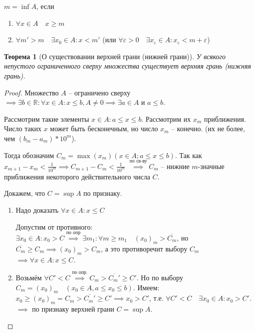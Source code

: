 \documentclass[a4paper,oneside]{article}
\newcommand{\bydef}{\stackrel{\text{по опр.}}{\implies}} %
\newtheorem{theorem}{Теорема}[subsection]
\theoremstyle{definition}
\theoremstyle{definition}
\theoremstyle{definition}
\begin{document}
$m = \inf A$, если 
\begin{enumerate}
    \item $\forall x \in A \quad x \ge m$
    \item $\forall m' > m \quad \exists x_0 \in A: x < m'$
    (или $\forall \varepsilon > 0 \quad \exists x_\varepsilon \in A: x_\varepsilon < m + \varepsilon$)
\end{enumerate}

\begin{theorem}[О существовании верхней грани (нижней грани)]
    У всякого непустого ограниченного сверху множества существует верхняя грань (нижняя грань).
\end{theorem}

\begin{proof}
    Множество $A$ -- ограничено сверху $\implies \exists b \in \mathbb{R}: \forall x \in A:
    x \le b, A \ne 0 \implies \exists a \in A$ и $a \le b$.

    Рассмотрим такие элементы $x \in A: a \le x \le b$. Рассмотрим их $x_m$ приближения.
    Число таких $x$ может быть бесконечным, но число $x_m$ -- конечно.
    (их не более, чем $(b_m - a_m) * 10^m$). 

    Тогда обозначим $C_m = \max (x_m) (x \in A; a \le x \le b)$.
    Так как $x_{m+1} - x_m < \frac{1}{10^m} \implies C_{m+1} - C_m < \frac{1}{10^m}$
    $\stackrel{\text{по св-ву}}{\implies} C_m$ -- нижние $m$-значные приближения некоторого 
    действительного числа $C$.

    Докажем, что $C = \sup A$ по признаку.
    \begin{enumerate}
        \item Надо доказать $\forall x \in A: x \le C$
        
        Допустим от противного: $\exists x_0 \in A: x_0 > C \stackrel{\text{по опр}}{\implies}
        \exists m_1: \forall m \ge m_1 \quad (x_0)_m > \overline{C_m}$, но
        $\overline{C_m} \ge C_m \implies (x_0)_m > C_m$, а это противоречит выбору $C_m$
        $\implies \forall x \in A: x \le C$.

        \item Возьмём $\forall C' < C \bydef C_m > \overline{C_m'} \ge C'$.
        Но по выбору $C_m = (x_0)_m \quad (x_0 \in A, a \le x_0 \le b)$.
        Имеем: $x_0 \ge (x_0)_m = C_m > \overline{C_m'} \ge C' \implies x_0 > C'$,
        т.е. $\forall C' < C \quad \exists x_0 \in A: x_0 > C'$.
        $\implies$ по признаку верхней грани $C = \sup A$.
    \end{enumerate}
\end{proof}
\end{document}
